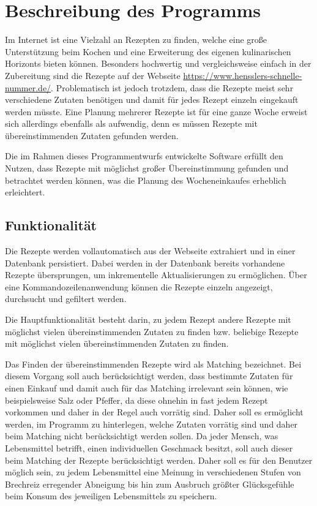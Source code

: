 \chapter{Beschreibung des Programms}
Im Internet ist eine Vielzahl an Rezepten zu finden, welche eine große Unterstützung beim Kochen und eine Erweiterung des eigenen kulinarischen Horizonts bieten können. Besonders hochwertig und vergleichsweise einfach in der Zubereitung sind die Rezepte auf der Webseite \url{https://www.hensslers-schnelle-nummer.de/}. Problematisch ist jedoch trotzdem, dass die Rezepte meist sehr verschiedene Zutaten benötigen und damit für jedes Rezept einzeln eingekauft werden müsste. Eine Planung mehrerer Rezepte ist für eine ganze Woche erweist sich allerdings ebenfalls als aufwendig, denn es müssen Rezepte mit übereinstimmenden Zutaten gefunden werden.

Die im Rahmen dieses Programmentwurfs entwickelte Software erfüllt den Nutzen, dass Rezepte mit möglichst großer Übereinstimmung gefunden und betrachtet werden können, was die Planung des Wocheneinkaufes erheblich erleichtert.

\section{Funktionalität}
Die Rezepte werden vollautomatisch aus der Webseite extrahiert und in einer Datenbank persistiert. Dabei werden in der Datenbank bereits vorhandene Rezepte übersprungen, um inkrementelle Aktualisierungen zu ermöglichen. Über eine Kommandozeilenanwendung können die Rezepte einzeln angezeigt, durchsucht und gefiltert werden.

Die Hauptfunktionalität besteht darin, zu jedem Rezept andere Rezepte mit möglichst vielen übereinstimmenden Zutaten zu finden bzw. beliebige Rezepte mit möglichst vielen übereinstimmenden Zutaten zu finden. 

Das Finden der übereinstimmenden Rezepte wird als Matching bezeichnet. Bei diesem Vorgang soll auch berücksichtigt werden, dass bestimmte Zutaten für einen Einkauf und damit auch für das Matching irrelevant sein können, wie beispielsweise Salz oder Pfeffer, da diese ohnehin in fast jedem Rezept vorkommen und daher in der Regel auch vorrätig sind. Daher soll es ermöglicht werden, im Programm zu hinterlegen, welche Zutaten vorrätig sind und daher beim Matching nicht berücksichtigt werden sollen. Da jeder Mensch, was Lebensmittel betrifft, einen individuellen Geschmack besitzt, soll auch dieser beim Matching der Rezepte berücksichtigt werden. Daher soll es für den Benutzer möglich sein, zu jedem Lebensmittel eine Meinung in verschiedenen Stufen von Brechreiz erregender Abneigung bis hin zum Ausbruch größter Glücksgefühle beim Konsum des jeweiligen Lebensmittels zu speichern.

